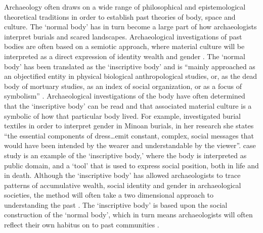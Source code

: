 	Archaeology often draws on a wide range of philosophical and epistemological theoretical traditions in order to establish past theories of body, space and culture\parencite[16] {Low_2003}. The ‘normal body’ has in turn become a large part of how archaeologists interpret burials and scared landscapes. Archaeological investigations of past bodies are often based on a semiotic approach, where material culture will be interpreted as a direct expression of identity wealth and gender \parencites{Barrett_1994}{Shanks_1987}. The ‘normal body’ has been translated as the ‘inscriptive body’ and is “mainly approached as an objectified entity in physical biological anthropological studies, or, as the dead body of mortuary studies, as an index of social organization, or as a focus of symbolism” \parencite[151]{Joyce_2005}. Archaeological investigations of the body have often determined that the ‘inscriptive body’ can be read and that associated material culture is a symbolic of how that particular body lived. For example, \textcite[114]{Lee_2000} investigated burial textiles in order to interpret gender in Minoan burials, in her research she states “the essential components of dress…emit constant, complex, social messages that would have been intended by the wearer and understandable by the viewer”.\textcite {Lee_2000} case study is an example of the ‘inscriptive body,’ where the body is interpreted as public domain, and a ‘tool’ that is used to express social position, both in life and in death. Although the ‘inscriptive body’ has allowed archaeologists to trace patterns of accumulative wealth, social identity and gender in archaeological societies, the method will often take a two dimensional approach to understanding the past \parencite {Meskell_1996}. The ‘inscriptive body’ is based upon the social construction of the ‘normal body’, which in turn means archaeologists will often reflect their own habitus on to past communities \parencites{Bourdieu_1977}{Comaroff_1989}.

